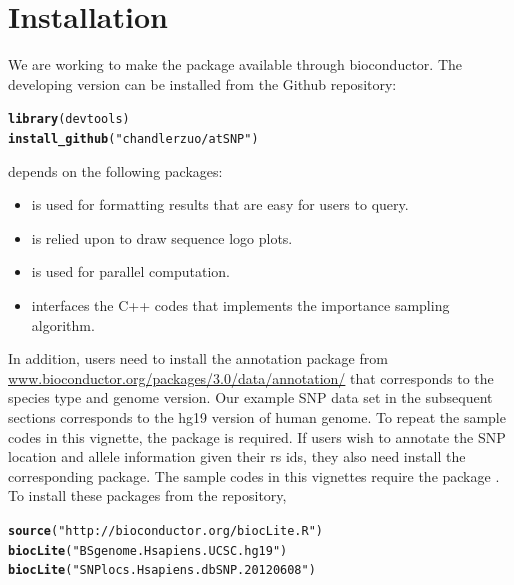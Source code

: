 \documentclass[a4paper,10pt]{article}\usepackage[]{graphicx}\usepackage[]{color}
\makeatletter
\newcommand{\hlstr}[1]{\textcolor[rgb]{0.192,0.494,0.8}{#1}}%
\newcommand{\hlstd}[1]{\textcolor[rgb]{0.345,0.345,0.345}{#1}}%
\newcommand{\hlkwd}[1]{\textcolor[rgb]{0.737,0.353,0.396}{\textbf{#1}}}%
\newenvironment{kframe}{%
 \def\at@end@of@kframe{}%
 \ifinner\ifhmode%
  \def\at@end@of@kframe{\end{minipage}}%
  \begin{minipage}{\columnwidth}%
 \fi\fi%
 \def\FrameCommand##1{\hskip\@totalleftmargin \hskip-\fboxsep
 \colorbox{shadecolor}{##1}\hskip-\fboxsep
     \hskip-\linewidth \hskip-\@totalleftmargin \hskip\columnwidth}%
 \MakeFramed {\advance\hsize-\width
   \@totalleftmargin\z@ \linewidth\hsize
   \@setminipage}}%
 {\par\unskip\endMakeFramed%
 \at@end@of@kframe}
\newenvironment{knitrout}{}{} %
\makeatother
\begin{document}
\section{Installation}

We are working to make the package available through bioconductor. The developing version can be installed from the Github repository:

\begin{knitrout}
\color{fgcolor}\begin{kframe}
\begin{alltt}
\hlkwd{library}\hlstd{(devtools)}
\hlkwd{install_github}\hlstd{(}\hlstr{"chandlerzuo/atSNP"}\hlstd{)}
\end{alltt}
\end{kframe}
\end{knitrout}

 depends on the following \R{} packages:

\begin{itemize}
\item {} is used for formatting results that are easy for users to query.
\item {} is relied upon to draw sequence logo plots.
\item {} is used for parallel computation.
\item {} interfaces the C++ codes that implements the importance sampling algorithm.
\end{itemize}
  
In addition, users need to install the annotation package  from \url{www.bioconductor.org/packages/3.0/data/annotation/} that corresponds to the species type and genome version. Our example SNP data set in the subsequent sections corresponds to the hg19 version of human genome. To repeat the sample codes in this vignette, the  package is required. If users wish to annotate the SNP location and allele information given their rs ids, they also need install the corresponding  package. The sample codes in this vignettes require the package . To install these packages from the \Bioconductor{} repository,

\begin{knitrout}
\color{fgcolor}\begin{kframe}
\begin{alltt}
  \hlkwd{source}\hlstd{(}\hlstr{"http://bioconductor.org/biocLite.R"}\hlstd{)}
  \hlkwd{biocLite}\hlstd{(}\hlstr{"BSgenome.Hsapiens.UCSC.hg19"}\hlstd{)}
  \hlkwd{biocLite}\hlstd{(}\hlstr{"SNPlocs.Hsapiens.dbSNP.20120608"}\hlstd{)}
\end{alltt}
\end{kframe}
\end{knitrout}
\end{document}
